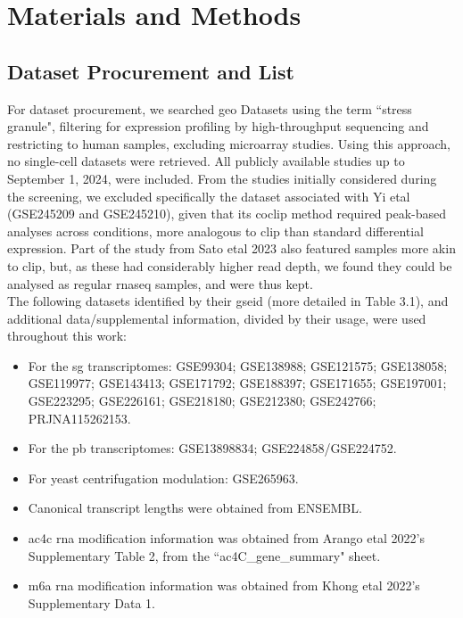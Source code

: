 \section{Materials and Methods}
 
\subsection{Dataset Procurement and List}

For dataset procurement, we searched \gls{geo} Datasets using the term ``stress granule", filtering for expression profiling by high-throughput sequencing and restricting to human samples, excluding microarray studies. Using this approach, no single-cell datasets were retrieved. All publicly available studies up to September 1, 2024, were included. From the studies initially considered during the screening, we excluded specifically the dataset associated with Yi \gls{etal} (GSE245209 and GSE245210)\cite{yi_mapping_2024}, given that its \gls{coclip} method required peak-based analyses across conditions, more analogous to \gls{clip} than standard differential expression. Part of the study from Sato \gls{etal} 2023\cite{sato_stress_2023} also featured samples more akin to \gls{clip}, but, as these had considerably higher read depth, we found they could be analysed as regular \gls{rnaseq} samples, and were thus kept.
\\
\linebreak
The following datasets identified by their \gls{gseid} (more detailed in Table 3.1), and additional data/supplemental information, divided by their usage, were used throughout this work:
\begin{itemize}
	\item For the \gls{sg} transcriptomes: GSE99304\cite{khong_stress_2017}; GSE138988\cite{matheny_transcriptome-wide_2019}; GSE121575\cite{padron_proximity_2019}; GSE138058\cite{somasekharan_g3bp1-linked_2020}; GSE119977\cite{matheny_rna_2021, matheny_corrigendum_2023}; GSE143413\cite{honda_high-depth_2021}; GSE171792\cite{shen_sexually_2022}; GSE188397\cite{sato_stress_2023}; GSE171655\cite{iadevaia_novel_2022}; GSE197001\cite{curdy_proteome_2023}; GSE223295\cite{ren_profiling_2023}; GSE226161\cite{xiao_profiling_2024}; GSE218180\cite{zhou_rna_2024}; GSE212380\cite{kudrin_n4-acetylcytidine_2024}; GSE242766\cite{di_timoteo_m6a_2024}; PRJNA115262153\cite{rajachandran_subcellular_2025}.
	\item For the \gls{pb} transcriptomes: GSE13898834\cite{matheny_transcriptome-wide_2019}; GSE224858/GSE224752\cite{kodali_rna_2024}.
	\item For yeast centrifugation modulation: GSE265963\cite{glauninger_transcriptome-wide_2025}.
	\item Canonical transcript lengths were obtained from ENSEMBL\cite{cunningham_ensembl_2022}.
	\item \gls{ac4c} \gls{rna} modification information was obtained from Arango \gls{etal} 2022\cite{arango_direct_2022}'s Supplementary Table 2, from the ``ac4C\_gene\_summary" sheet.
	\item \gls{m6a} \gls{rna} modification information was obtained from Khong \gls{etal} 2022's Supplementary Data 1.
\end{itemize}

